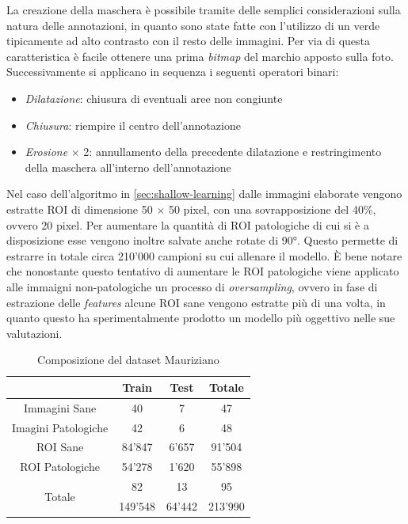 La creazione della maschera è possibile tramite delle semplici
considerazioni sulla natura delle annotazioni, in quanto sono
state fatte con l'utilizzo di un verde tipicamente ad alto
contrasto con il resto delle immagini.
Per via di questa caratteristica è facile ottenere una prima
{\it bitmap} del marchio apposto sulla foto.
Successivamente si applicano in sequenza i seguenti operatori
binari:

\begin{itemize}
    \item {\it Dilatazione}: chiusura di eventuali aree non congiunte
    \item {\it Chiusura}: riempire il centro dell'annotazione
    \item {\it Erosione} $\times$ 2: annullamento della precedente dilatazione
    e restringimento della maschera all'interno dell'annotazione
\end{itemize}

Nel caso dell'algoritmo in \ref{sec:shallow-learning} dalle immagini
elaborate vengono estratte ROI di dimensione 50 $\times$ 50 pixel,
con una sovrapposizione del 40\%, ovvero 20 pixel.
Per aumentare la quantità di ROI patologiche di cui si è a disposizione
esse vengono inoltre salvate anche rotate di 90°.
Questo permette di estrarre in totale circa 210'000 campioni su cui allenare
il modello.
È bene notare che nonostante questo tentativo di aumentare le ROI
patologiche viene applicato alle immaigni non-patologiche un processo
di {\it oversampling}, ovvero in fase di estrazione delle {\it features}
alcune ROI sane vengono estratte più di una volta, in quanto questo
ha sperimentalmente prodotto un modello più oggettivo nelle sue
valutazioni.

\begin{table}
    \center
    \begin{tabular}[h]{||c||c|c|c||}
        \hline
        & Train & Test & Totale \\
        \hline
        Immagini Sane & 40 & 7 & 47 \\
        \hline
        Imagini Patologiche & 42 & 6 & 48 \\
        \hline
        ROI Sane & 84'847 & 6'657 & 91'504 \\
        \hline
        ROI Patologiche & 54'278 & 1'620 & 55'898\\
        \hline
        \hline
        \multirow{2}{*}{Totale} & 82 & 13 & 95 \\ \cline{2-4}
        & 149'548 & 64'442 & 213'990 \\
        \hline
    \end{tabular}
    \caption{\label{tab:mauriziano}Composizione del dataset Mauriziano}
\end{table}

